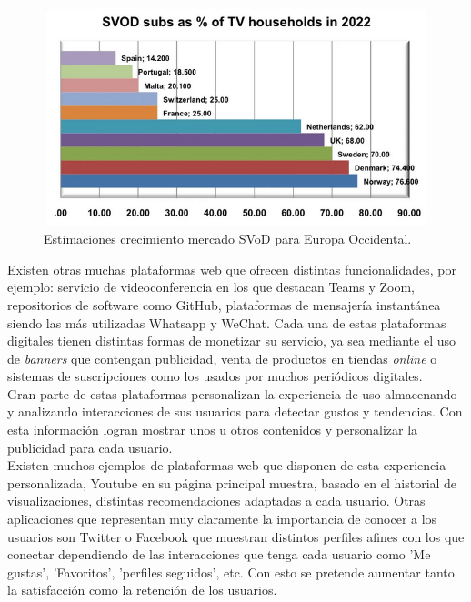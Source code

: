 \documentclass[a4paper, 12pt]{book}
\begin{document}
		\begin{figure}[H]
			\centering
			\includegraphics[width=12cm, keepaspectratio]{img/SVoD.png}
			\caption{Estimaciones crecimiento mercado SVoD para Europa Occidental.}
			\label{fig:svod}
		\end{figure}
		
		
		Existen otras muchas plataformas web que ofrecen distintas funcionalidades, por ejemplo: servicio de videoconferencia  en los que destacan Teams y Zoom, repositorios de software como GitHub, plataformas de mensajería instantánea siendo las más utilizadas Whatsapp y WeChat. Cada una de estas plataformas digitales tienen distintas formas de monetizar su servicio, ya sea mediante el uso de \textit{banners} que contengan publicidad, venta de productos en tiendas \textit{online} o sistemas de suscripciones como los usados por muchos periódicos digitales. \\
		
		Gran parte de estas plataformas personalizan la experiencia de uso almacenando y analizando interacciones de sus usuarios para detectar gustos y tendencias. Con esta información logran mostrar unos u otros contenidos y personalizar la publicidad para cada usuario. \\
		
		Existen muchos ejemplos de plataformas web que disponen de esta experiencia personalizada, Youtube en su página principal muestra, basado en el historial de visualizaciones, distintas recomendaciones adaptadas a cada usuario. Otras aplicaciones que representan muy claramente la importancia de conocer a los usuarios son Twitter o Facebook que muestran distintos perfiles afines con los que conectar dependiendo de las interacciones que tenga cada usuario como 'Me gustas', 'Favoritos', 'perfiles seguidos', etc. Con esto se pretende aumentar tanto la satisfacción como la retención de los usuarios. \\
		
\end{document}
